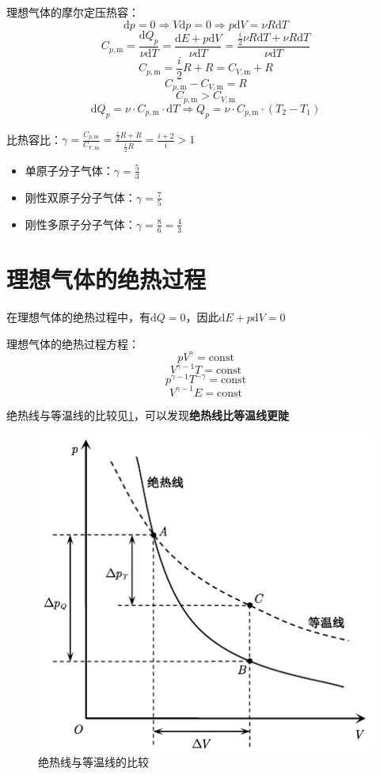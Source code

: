 \documentclass[12pt, a4paper, twoside]{ctexbook}
\begin{document}
{\sonti 理想气体的摩尔定压热容}：
$$
\mathrm{d}p=0 \Rightarrow V\mathrm{d}p=0 \Rightarrow p\mathrm{d}V=\nu R\mathrm{d}T
$$
$$
C_{p,\mathrm{m}}=\frac{\mathrm{d}Q_p}{\nu \mathrm{d}T}=\frac{\mathrm{d}E+p\mathrm{d}V}{\nu \mathrm{d}T}=\frac{\frac{i}{2} \nu R\mathrm{d}T+\nu R\mathrm{d}T}{\nu \mathrm{d}T}
$$
$$
C_{p,\mathrm{m}}=\frac{i}{2}R+R=C_{V,\mathrm{m}}+R
$$
$$
C_{p,\mathrm{m}}-C_{V,\mathrm{m}}=R
$$
$$
C_{p,\mathrm{m}}>C_{V,\mathrm{m}}
$$
$$
\mathrm{d}Q_p=\nu\cdot C_{p,\mathrm{m}} \cdot \mathrm{d}T \Rightarrow Q_p=\nu\cdot C_{p,\mathrm{m}}\cdot\left(T_2-T_1\right)
$$

{\sonti 比热容比}：$\gamma =\frac{C_{p,\mathrm{m}}}{C_{V,\mathrm{m}}}=\frac{\frac{i}{2}R+R}{\frac{i}{2}R}=\frac{i+2}{i}>1$
\begin{itemize}
    \item {\sonti 单原子分子气体}：$\gamma = \frac{5}{3}$
    \item {\sonti 刚性双原子分子气体}：$\gamma = \frac{7}{5}$
    \item {\sonti 刚性多原子分子气体}：$\gamma = \frac{8}{6}=\frac{4}{3}$
\end{itemize}
\section{理想气体的绝热过程}
在理想气体的绝热过程中，有$\mathrm{d}Q=0$，因此$\mathrm{d}E+p\mathrm{d}V=0$

{\sonti 理想气体的绝热过程方程}：
$$
pV^\gamma=\mathrm{const}
$$
$$
V^{\gamma-1}T=\mathrm{const}
$$
$$
p^{\gamma-1}T^{-\gamma}=\mathrm{const}
$$
$$
V^{\gamma-1}E=\mathrm{const}
$$

绝热线与等温线的比较见\textcolor{blue}{\cref{fig:绝热线与等温线的比较}}，可以发现\textbf{绝热线比等温线更陡}
\begin{figure}[H]
    \centerline{\includegraphics[scale=1.2]{绝热线与等温线的比较.pdf}}
    \caption{绝热线与等温线的比较}\label{fig:绝热线与等温线的比较}
\end{figure}
\end{document}
